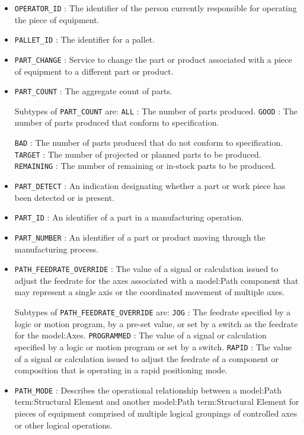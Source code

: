 \begin{itemize}
\item \texttt{OPERATOR_ID} : The identifier of the person currently responsible for operating the piece of equipment. 

\item \texttt{PALLET_ID} : The identifier for a pallet. 

\item \texttt{PART_CHANGE} : Service to change the part or product associated with a piece of equipment to a different part or product. 

\item \texttt{PART_COUNT} : The aggregate count of parts. 

Subtypes of \texttt{PART_COUNT} are: 
\newline\tab \texttt{ALL} : The number of parts produced.  
\newline\tab \texttt{GOOD} : The number of parts produced that conform to specification.
 
\newline\tab \texttt{BAD} : The number of parts produced that do not conform to specification. 
\newline\tab \texttt{TARGET} : The number of projected or planned parts to be produced. 
\newline\tab \texttt{REMAINING} : The number of remaining or in-stock parts to be produced. 
\item \texttt{PART_DETECT} : An indication designating whether a part or work piece has been detected or is present. 

\item \texttt{PART_ID} : An identifier of a part in a manufacturing operation. 

\item \texttt{PART_NUMBER} : An identifier of a part or product moving through the manufacturing process. 

\item \texttt{PATH_FEEDRATE_OVERRIDE} : The value of a signal or calculation issued to adjust the feedrate for the axes associated with a {model:Path} component that may represent a single axis or the coordinated movement of multiple axes. 

Subtypes of \texttt{PATH_FEEDRATE_OVERRIDE} are: 
\newline\tab \texttt{JOG} : The feedrate specified by a logic or motion program, by a pre-set value, or set by a switch as the feedrate for the {model:Axes}.  
\newline\tab \texttt{PROGRAMMED} : The value of a signal or calculation specified by a logic or motion program or set by a switch. 
\newline\tab \texttt{RAPID} : The value of a signal or calculation issued to adjust the feedrate of a component or composition that is operating in a rapid positioning mode. 
\item \texttt{PATH_MODE} : Describes the operational relationship between a {model:Path} {term:Structural Element} and another {model:Path} {term:Structural Element} for pieces of equipment comprised of multiple logical groupings of controlled axes or other logical operations. 


\end{itemize}
